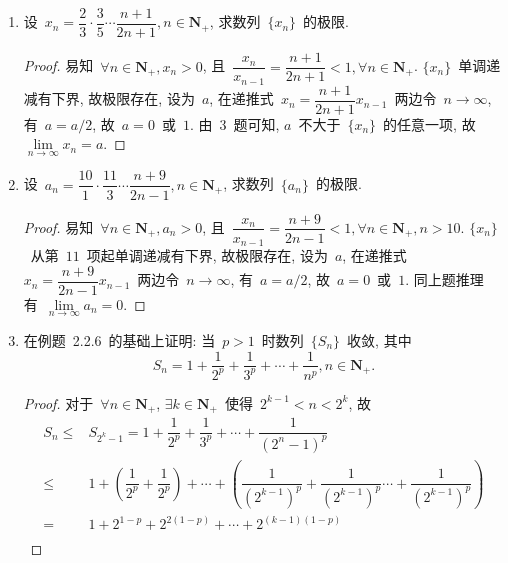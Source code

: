\documentclass[UTF8,a4paper,11pt,twoside]{book}
\begin{document}
\begin{enumerate}
\begin{proof}
		      设~$\{y_n\}$~是单调减少有下界的数列, 则~$\{-y_n\}$~是单调增加有上界的数列, 由单调有界原理, 若~$\lim\limits_{n\to\infty} y_n=b$, 则~$\lim\limits_{n\to\infty} -y_n=-b$. 由前可知, $\forall n\in\mathbf{N}_{+}, -y_n\leqslant-b$, 即~$\forall n\in\mathbf{N}_{+}, y_n\geqslant b$.\qedhere
	      \end{proof}
	\item 设~$x_n=\dfrac{2}{3}\cdot\dfrac{3}{5}\cdots\dfrac{n+1}{2n+1}, n\in\mathbf{N}_{+}$, 求数列~$\{x_n\}$~的极限.
	      \begin{proof}
		      易知~$\forall n\in\mathbf{N}_{+}, x_n>0$, 且~$\dfrac{x_n}{x_{n-1}}=\dfrac{n+1}{2n+1}<1, \forall n\in\mathbf{N}_{+}$. $\{x_n\}$~单调递减有下界, 故极限存在, 设为~$a$, 在递推式~$x_n=\dfrac{n+1}{2n+1}x_{n-1}$~两边令~$n\to\infty$, 有~$a=a/2$, 故~$a=0$~或~$1$. 由~3~题可知, $a$~不大于~$\{x_n\}$~的任意一项, 故~$\lim\limits_{n\to\infty} x_n=a$.\qedhere
	      \end{proof}
	\item 设~$a_n=\dfrac{10}{1}\cdot\dfrac{11}{3}\cdots\dfrac{n+9}{2n-1}, n\in\mathbf{N}_{+}$, 求数列~$\{a_n\}$~的极限.
	      \begin{proof}
		      易知~$\forall n\in\mathbf{N}_{+}, a_n>0$, 且~$\dfrac{x_n}{x_{n-1}}=\dfrac{n+9}{2n-1}<1, \forall n\in\mathbf{N}_{+}, n>10$. $\{x_n\}$~从第~$11$~项起单调递减有下界, 故极限存在, 设为~$a$, 在递推式~$x_n=\dfrac{n+9}{2n-1}x_{n-1}$~两边令~$n\to\infty$, 有~$a=a/2$, 故~$a=0$~或~$1$. 同上题推理有~$\lim\limits_{n\to\infty} a_n=0$.\qedhere
	      \end{proof}
	\item 在例题~2.2.6~的基础上证明: 当~$p>1$~时数列~$\{S_n\}$~收敛, 其中
	      \[
		      S_n=1+\dfrac{1}{2^p}+\dfrac{1}{3^p}+\cdots+\dfrac{1}{n^p}, n\in\mathbf{N}_{+}.
	      \]
	      \begin{proof}
		      对于~$\forall n\in\mathbf{N}_{+}$, $\exists k\in\mathbf{N}_{+}$~使得~$2^{k-1}<n<2^{k}$, 故
		      \begin{equation*}
			      \begin{split}
				      S_n\leqslant & S_{2^k-1}=1+\dfrac{1}{2^p}+\dfrac{1}{3^p}+\cdots+\dfrac{1}{(2^n-1)^p}                                                                                         \\
				      \leqslant        & 1+\left(\dfrac{1}{2^p}+\dfrac{1}{2^p}\right)+\cdots+\left(\dfrac{1}{(2^{k-1})^p}+\dfrac{1}{(2^{k-1})^p}\cdots+\dfrac{1}{(2^{k-1})^p}\right) \\
				      =                & 1+2^{1-p}+2^{2(1-p)}+\cdots+2^{(k-1)(1-p)}                                                                                                    \\

\end{split}
\end{equation*}
\end{proof}
\end{enumerate}
\end{document}
